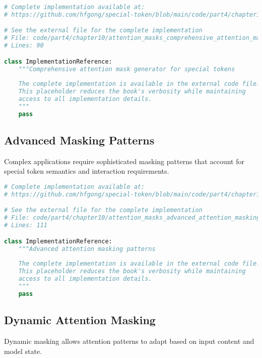 \begin{lstlisting}[language=Python, caption={Comprehensive attention mask generator for special tokens}]
# Complete implementation available at:
# https://github.com/hfgong/special-token/blob/main/code/part4/chapter10/attention_masks_comprehensive_attention_mask_g.py

# See the external file for the complete implementation
# File: code/part4/chapter10/attention_masks_comprehensive_attention_mask_g.py
# Lines: 90

class ImplementationReference:
    """Comprehensive attention mask generator for special tokens
    
    The complete implementation is available in the external code file.
    This placeholder reduces the book's verbosity while maintaining
    access to all implementation details.
    """
    pass
\end{lstlisting}

\subsection{Advanced Masking Patterns}

Complex applications require sophisticated masking patterns that account for special token semantics and interaction requirements.

\begin{lstlisting}[language=Python, caption={Advanced attention masking patterns}]
# Complete implementation available at:
# https://github.com/hfgong/special-token/blob/main/code/part4/chapter10/attention_masks_advanced_attention_masking_pat.py

# See the external file for the complete implementation
# File: code/part4/chapter10/attention_masks_advanced_attention_masking_pat.py
# Lines: 111

class ImplementationReference:
    """Advanced attention masking patterns
    
    The complete implementation is available in the external code file.
    This placeholder reduces the book's verbosity while maintaining
    access to all implementation details.
    """
    pass
\end{lstlisting}

\subsection{Dynamic Attention Masking}

Dynamic masking allows attention patterns to adapt based on input content and model state.

